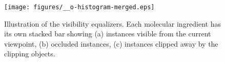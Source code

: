 





\begin{figure}[t]
\centering 
\texttt{[image: figures/\_\_o-histogram-merged.eps]}
\caption{\label{fig:ohist}Illustration of the visibility equalizers. 
Each molecular ingredient has its own stacked bar showing (a) instances visible from the current viewpoint, (b) occluded instances, (c) instances clipped away by the clipping objects.}
\end{figure}

